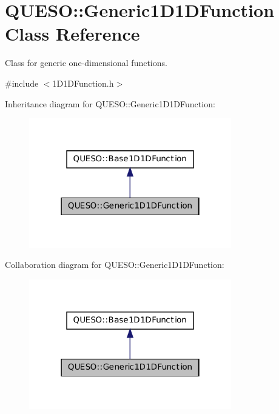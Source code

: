 \hypertarget{class_q_u_e_s_o_1_1_generic1_d1_d_function}{\section{Q\-U\-E\-S\-O\-:\-:Generic1\-D1\-D\-Function Class Reference}
\label{class_q_u_e_s_o_1_1_generic1_d1_d_function}
}


Class for generic one-\/dimensional functions.  




{\ttfamily \#include $<$1\-D1\-D\-Function.\-h$>$}



Inheritance diagram for Q\-U\-E\-S\-O\-:\-:Generic1\-D1\-D\-Function\-:
\nopagebreak
\begin{figure}[H]
\begin{center}
\leavevmode
\includegraphics[width=250pt]{class_q_u_e_s_o_1_1_generic1_d1_d_function__inherit__graph}
\end{center}
\end{figure}


Collaboration diagram for Q\-U\-E\-S\-O\-:\-:Generic1\-D1\-D\-Function\-:
\nopagebreak
\begin{figure}[H]
\begin{center}
\leavevmode
\includegraphics[width=250pt]{class_q_u_e_s_o_1_1_generic1_d1_d_function__coll__graph}
\end{center}
\end{figure}
